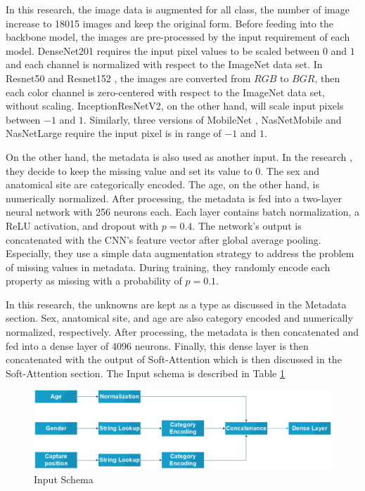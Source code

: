 \documentclass[sensors,article,submit,pdftex,moreauthors]{Definitions/mdpi}
\begin{document}
	In this research, the image data is augmented for all class, the number of image increase to 18015 images and keep the original form. Before feeding into the backbone model, the images are pre-processed by the input requirement of each model. DenseNet201 \cite{06993} requires the input pixel values to be scaled between $0$ and $1$ and each channel is normalized with respect to the ImageNet data set. In Resnet50 and Resnet152 \cite{03385} \cite{05027}, the images are converted from $RGB$ to $BGR$, then each color channel is zero-centered with respect to the ImageNet data set, without scaling. InceptionResNetV2\cite{11946}, on the other hand, will scale input pixels between $-1$ and $1$. Similarly, three versions of MobileNet \cite{04861} \cite{04381} \cite{02244}, NasNetMobile and NasNetLarge \cite{07012} require the input pixel is in range of $-1$ and $1$. 
	
	On the other hand, the metadata is also used as another input. In the research \cite{03910}, they decide to keep the missing value and set its value to $0$. The sex and anatomical site are categorically encoded. The age, on the other hand, is numerically normalized. After processing, the metadata is fed into a two-layer neural network with 256 neurons each. Each layer contains batch normalization, a ReLU \cite{08375} activation, and dropout with $p = 0.4$. The network’s output is concatenated with the CNN’s feature vector after global average pooling. Especially, they use a simple data augmentation strategy to address the problem of missing values in metadata. During training, they randomly encode each property as missing with a probability of $p = 0.1$. 
	
	In this research, the unknowns are kept as a type as discussed in the Metadata section. Sex, anatomical site, and age are also category encoded and numerically normalized, respectively. After processing, the metadata is then concatenated and fed into a dense layer of 4096 neurons. Finally, this dense layer is then concatenated with the output of Soft-Attention which is then discussed in the Soft-Attention section. The Input schema is described in Table \ref{fig:input-schema}
	
	\begin{figure}[H]
		\centering
		\includegraphics[width=1\linewidth]{"Definitions/Input Schema"}
		\caption{Input Schema}
		\label{fig:input-schema}
	\end{figure}
	
\end{document}
